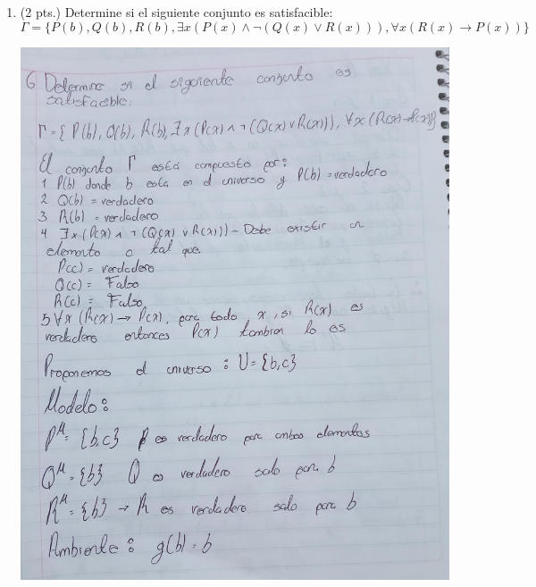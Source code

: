 \documentclass[12pt,letterpaper]{article}
\begin{document}
\begin{enumerate}
  \newpage
  
\item (2 pts.) Determine si el siguiente conjunto es satisfacible:
  \[
  \Gamma = \{P(b), Q(b), R(b), \exists x(P(x) \land \neg(Q(x) \lor R(x))), \forall x(R(x) \to P(x))\}
  \]
  \begin{center}
    \hspace{-1.2cm} \includegraphics[width=\textwidth,height=1.1\textheight,keepaspectratio]{ejercicio6a.png}
  \end{center}


\end{enumerate}
\end{document}
